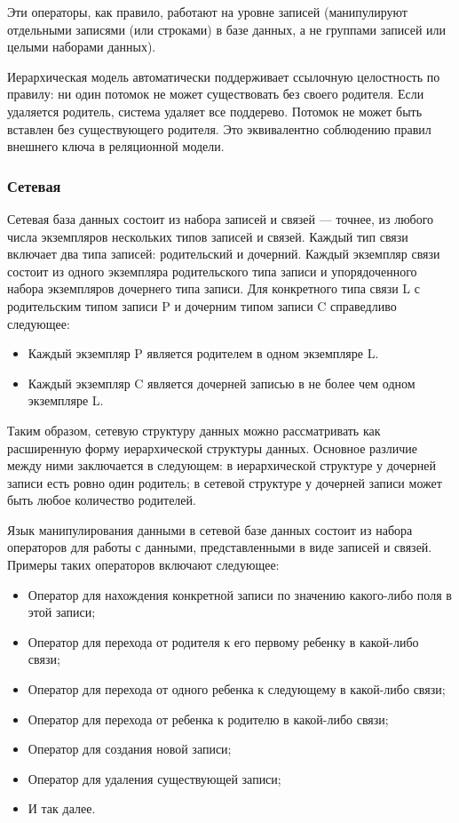 Эти операторы, как правило, работают на уровне записей (манипулируют отдельными записями (или строками) в базе данных, а не группами записей или целыми наборами данных).~\cite{date-wr}

Иерархическая модель автоматически поддерживает ссылочную целостность по правилу: ни один потомок не может существовать без своего родителя.
Если удаляется родитель, система удаляет все поддерево.
Потомок не может быть вставлен без существующего родителя.
Это эквивалентно соблюдению правил внешнего ключа в реляционной модели.~\cite{date-wr}

\subsubsection{Сетевая}

Сетевая база данных состоит из набора записей и связей --- точнее, из любого числа экземпляров нескольких типов записей и связей.
Каждый тип связи включает два типа записей: родительский и дочерний.
Каждый экземпляр связи состоит из одного экземпляра родительского типа записи и упорядоченного набора экземпляров дочернего типа записи.
Для конкретного типа связи L с родительским типом записи P и дочерним типом записи C справедливо следующее:
\begin{itemize}
    \item Каждый экземпляр P является родителем в одном экземпляре L.
    \item Каждый экземпляр C является дочерней записью в не более чем одном экземпляре L.
\end{itemize}

Таким образом, сетевую структуру данных можно рассматривать как расширенную форму иерархической структуры данных.
Основное различие между ними заключается в следующем: в иерархической структуре у дочерней записи есть ровно один родитель; в сетевой структуре у дочерней записи может быть любое количество родителей.~\cite{date-wr}

Язык манипулирования данными в сетевой базе данных состоит из набора операторов для работы с данными, представленными в виде записей и связей.
Примеры таких операторов включают следующее:
\begin{itemize}
    \item Оператор для нахождения конкретной записи по значению какого-либо поля в этой записи;
    \item Оператор для перехода от родителя к его первому ребенку в какой-либо связи;
    \item Оператор для перехода от одного ребенка к следующему в какой-либо связи;
    \item Оператор для перехода от ребенка к родителю в какой-либо связи;
    \item Оператор для создания новой записи;
    \item Оператор для удаления существующей записи;
    \item И так далее.
\end{itemize}

